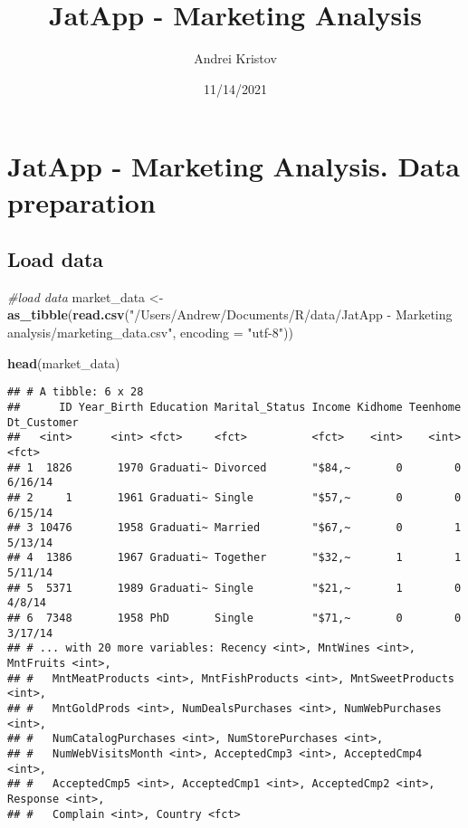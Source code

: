 \documentclass[]{article}
\title{JatApp - Marketing Analysis}
\author{Andrei Kristov}
\date{11/14/2021}
\newenvironment{Shaded}{\begin{snugshade}}{\end{snugshade}}
\newcommand{\CommentTok}[1]{\textcolor[rgb]{0.56,0.35,0.01}{\textit{#1}}}
\newcommand{\DataTypeTok}[1]{\textcolor[rgb]{0.13,0.29,0.53}{#1}}
\newcommand{\KeywordTok}[1]{\textcolor[rgb]{0.13,0.29,0.53}{\textbf{#1}}}
\newcommand{\NormalTok}[1]{#1}
\newcommand{\StringTok}[1]{\textcolor[rgb]{0.31,0.60,0.02}{#1}}
\begin{document}
\maketitle

\hypertarget{jatapp---marketing-analysis.-data-preparation}{%
\section{JatApp - Marketing Analysis. Data
preparation}\label{jatapp---marketing-analysis.-data-preparation}}

\hypertarget{load-data}{%
\subsection{Load data}\label{load-data}}

\begin{Shaded}
\begin{Highlighting}[]
\CommentTok{#load data}
\NormalTok{market_data <-}\StringTok{ }\KeywordTok{as_tibble}\NormalTok{(}\KeywordTok{read.csv}\NormalTok{(}\StringTok{"/Users/Andrew/Documents/R/data/JatApp - Marketing analysis/marketing_data.csv"}\NormalTok{, }\DataTypeTok{encoding =} \StringTok{"utf-8"}\NormalTok{))}

\KeywordTok{head}\NormalTok{(market_data)}
\end{Highlighting}
\end{Shaded}

\begin{verbatim}
## # A tibble: 6 x 28
##      ID Year_Birth Education Marital_Status Income Kidhome Teenhome Dt_Customer
##   <int>      <int> <fct>     <fct>          <fct>    <int>    <int> <fct>      
## 1  1826       1970 Graduati~ Divorced       "$84,~       0        0 6/16/14    
## 2     1       1961 Graduati~ Single         "$57,~       0        0 6/15/14    
## 3 10476       1958 Graduati~ Married        "$67,~       0        1 5/13/14    
## 4  1386       1967 Graduati~ Together       "$32,~       1        1 5/11/14    
## 5  5371       1989 Graduati~ Single         "$21,~       1        0 4/8/14     
## 6  7348       1958 PhD       Single         "$71,~       0        0 3/17/14    
## # ... with 20 more variables: Recency <int>, MntWines <int>, MntFruits <int>,
## #   MntMeatProducts <int>, MntFishProducts <int>, MntSweetProducts <int>,
## #   MntGoldProds <int>, NumDealsPurchases <int>, NumWebPurchases <int>,
## #   NumCatalogPurchases <int>, NumStorePurchases <int>,
## #   NumWebVisitsMonth <int>, AcceptedCmp3 <int>, AcceptedCmp4 <int>,
## #   AcceptedCmp5 <int>, AcceptedCmp1 <int>, AcceptedCmp2 <int>, Response <int>,
## #   Complain <int>, Country <fct>
\end{verbatim}
\end{document}

